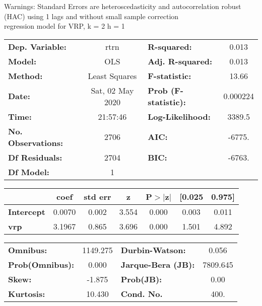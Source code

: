 Warnings: \newline
 [1] Standard Errors are heteroscedasticity and autocorrelation robust (HAC) using 1 lags and without small sample correction\\ 

regression model for VRP, k = 2 h = 1\begin{center}
\begin{tabular}{lclc}
\toprule
\textbf{Dep. Variable:}    &       rtrn       & \textbf{  R-squared:         } &     0.013   \\
\textbf{Model:}            &       OLS        & \textbf{  Adj. R-squared:    } &     0.013   \\
\textbf{Method:}           &  Least Squares   & \textbf{  F-statistic:       } &     13.66   \\
\textbf{Date:}             & Sat, 02 May 2020 & \textbf{  Prob (F-statistic):} &  0.000224   \\
\textbf{Time:}             &     21:57:46     & \textbf{  Log-Likelihood:    } &    3389.5   \\
\textbf{No. Observations:} &        2706      & \textbf{  AIC:               } &    -6775.   \\
\textbf{Df Residuals:}     &        2704      & \textbf{  BIC:               } &    -6763.   \\
\textbf{Df Model:}         &           1      & \textbf{                     } &             \\
\bottomrule
\end{tabular}
\begin{tabular}{lcccccc}
                   & \textbf{coef} & \textbf{std err} & \textbf{z} & \textbf{P$> |$z$|$} & \textbf{[0.025} & \textbf{0.975]}  \\
\midrule
\textbf{Intercept} &       0.0070  &        0.002     &     3.554  &         0.000        &        0.003    &        0.011     \\
\textbf{vrp}       &       3.1967  &        0.865     &     3.696  &         0.000        &        1.501    &        4.892     \\
\bottomrule
\end{tabular}
\begin{tabular}{lclc}
\textbf{Omnibus:}       & 1149.275 & \textbf{  Durbin-Watson:     } &    0.056  \\
\textbf{Prob(Omnibus):} &   0.000  & \textbf{  Jarque-Bera (JB):  } & 7809.645  \\
\textbf{Skew:}          &  -1.875  & \textbf{  Prob(JB):          } &     0.00  \\
\textbf{Kurtosis:}      &  10.430  & \textbf{  Cond. No.          } &     400.  \\
\bottomrule
\end{tabular}
\end{center}

